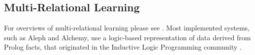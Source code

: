 
\subsection{Multi-Relational Learning} 
For overviews of multi-relational learning please see \cite{SRL2007,Domingos2009,Kimmig2015}. 
Most implemented systems, such as Aleph and Alchemy, use a logic-based representation of data derived from Prolog facts, that originated in the Inductive Logic Programming community \cite{Dzeroski2001c}. 

